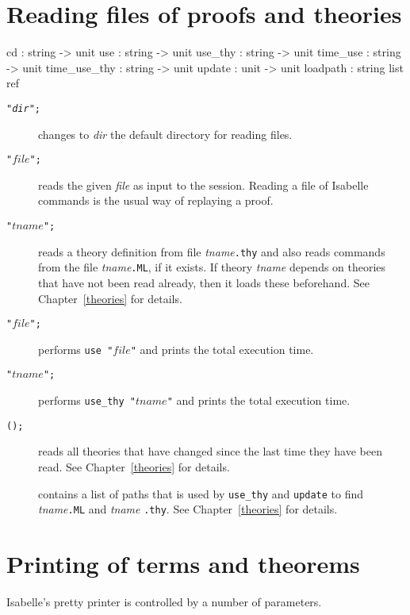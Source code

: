 \section{Reading files of proofs and theories}
\begin{ttbox} 
cd              : string -> unit
use             : string -> unit
use_thy         : string -> unit
time_use        : string -> unit
time_use_thy    : string -> unit
update          : unit -> unit
loadpath        : string list ref
\end{ttbox}
\begin{description}
\item[ \tt"{\it dir}";]  changes to {\it dir\/} the default
directory for reading files.

\item[ \tt"$file$";]  
reads the given {\it file} as input to the \ML{} session.  Reading a file
of Isabelle commands is the usual way of replaying a proof.

\item[ \tt"$tname$";] 
  reads a theory definition from file {\it tname}{\tt.thy} and also reads
  {\ML} commands from the file {\it tname}{\tt.ML}, if it exists.  If
  theory {\it tname} depends on theories that have not been read already,
  then it loads these beforehand.  See Chapter~\ref{theories} for
  details.

\item[ \tt"$file$";]  
performs {\tt use~"$file$"} and prints the total execution time.

\item[ \tt"$tname$";]  
performs {\tt use_thy "$tname$"} and prints the total execution time.

\item[ \tt();]  
reads all theories that have changed since the last time they have been read.
See Chapter~\ref{theories} for details.

\item[] contains a list of paths that is used by 
{\tt use_thy} and {\tt update} to find {\it tname}{\tt.ML} and {\it tname}
{\tt.thy}.  See Chapter~\ref{theories} for details.
\end{description}


\section{Printing of terms and theorems}
Isabelle's pretty printer is controlled by a number of parameters.

